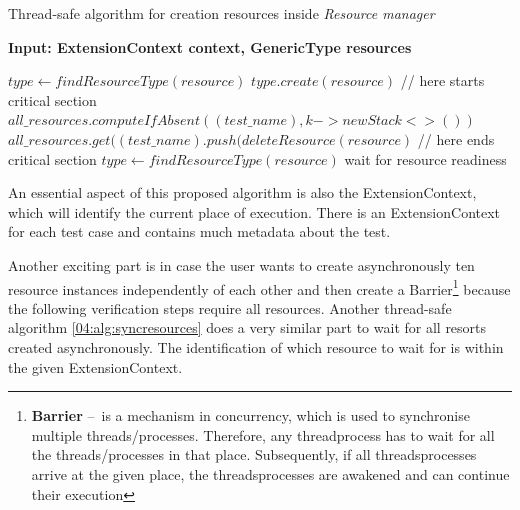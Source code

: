 \begin{algorithm}[H]
    \label{04:alg:creationofresource}
    \caption{Thread-safe algorithm for creation resources inside \emph{Resource manager}}

    \hspace*{\algorithmicindent} \textbf{Input: ExtensionContext context, GenericType resources}

    \begin{algorithmic}[1]
        \State $type \gets findResourceType(resource)$
        \State $type.create(resource)$
        \State // here starts critical section
        \State $all\_resources.computeIfAbsent((test\_name), k -> new Stack<>())$
        \State $all\_resources.get((test\_name).push(deleteResource(resource)$
        \State // here ends critical section
            \State $type \gets findResourceType(resource)$
            \State wait for resource readiness
            \EndForEach
        \EndIf
        \EndForEach
    \end{algorithmic}
\end{algorithm}

An essential aspect of this proposed algorithm is also the ExtensionContext, which will identify the current place of execution. There is an ExtensionContext for each test case and contains much metadata about the test.

Another exciting part is in case the user wants to create asynchronously ten resource instances independently of each other and then create a Barrier\footnote {\textbf{Barrier} \---\ is a mechanism in concurrency, which is used to synchronise multiple threads/processes. Therefore, any thread\/process has to wait for all the threads/processes in that place. Subsequently, if all threads\/processes arrive at the given place, the threads\/processes are awakened and can continue their execution} because the following verification steps require all resources. Another thread-safe algorithm \ref{04:alg:syncresources} does a very similar part to wait for all resorts created asynchronously. The identification of which resource to wait for is within the given ExtensionContext.

